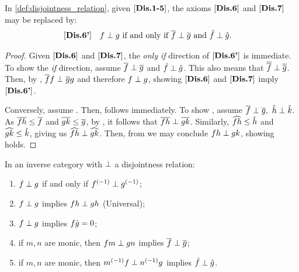 \begin{lemma}\label{lem:disjointness_equivalent_axioms}
  In \ref{def:disjointness_relation}, given $[\text{\bfseries {Dis}.{1-5}}]$, the axioms $[\text{\bfseries {Dis}.{6}}]$ and
  $[\text{\bfseries {Dis}.{7}}]$ may be replaced by:
  \begin{align*}
    [\text{\bfseries {Dis}.{6'}}]\quad &f\perp g\text{ if and only if }\overline{f} \perp \overline{g}
      \text{ and }\hat{f}\perp\hat{g}.
  \end{align*}
\end{lemma}
\begin{proof}
  Given $[\text{\bfseries {Dis}.{6}}]$ and $[\text{\bfseries {Dis}.{7}}]$, the \emph{only if} direction of $[\text{\bfseries {Dis}.{6'}}]$ is
  immediate. To show the \emph{if} direction, assume $\overline{f} \perp \overline{g}$ and
  $\hat{f}\perp\hat{g}$. This also means that $\overline{\overline{f}} \perp \overline{\overline{g}}$. Then, by
  , $\overline{f} f \perp \overline{g}g$ and therefore $f \perp g$, showing $[\text{\bfseries {Dis}.{6}}]$
  and $[\text{\bfseries {Dis}.{7}}]$ imply $[\text{\bfseries {Dis}.{6'}}]$.

  Conversely, assume . Then,  follows immediately. To show
  , assume $\overline{f}\perp \overline{g},\ \hat{h}\perp \hat{k}$. As
  $\overline{f h} \le \overline{f}$ and $\overline{g k}\le\overline{g}$, by , it follows that
  $\overline{f h} \perp \overline{g k}$. Similarly, $\widehat{f h} \le \hat{h}$ and $\widehat{g k} \le \hat{k}$,
  giving us $\widehat{f h}\perp \widehat{g k}$. Then, from  we may conclude
  $f h \perp g k$, showing  holds.
\end{proof}
\begin{lemma}\label{lem:disjointness_various}
  In an inverse category \X with $\perp$ a disjointness relation:
  \begin{enumerate}[{(}i{)}]
    \item $f \perp g$ if and only if ${f}^{(-1)}\perp {g}^{(-1)}$; \label{lemitem:djv_inverses}
    \item $f \perp g$ implies $f h \perp g h$ (Universal);\label{lemitem:djv_universal}
    \item $f \perp g$ implies $f\hat{g} = 0$; \label{lemitem:djv_disjoint_composition_is_0}
    \item if $m,n$ are monic, then $f m \perp g n$ implies $\overline{f} \perp \overline{g}$;
      \label{lemitem:djv_monic_implies}
    \item if $m,n$ are monic, then ${m}^{(-1)} f \perp {n}^{(-1)}g$ implies $\hat{f} \perp \hat{g}$.
      \label{lemitem:djv_inv_monic_implies}
  \end{enumerate}
\end{lemma}
